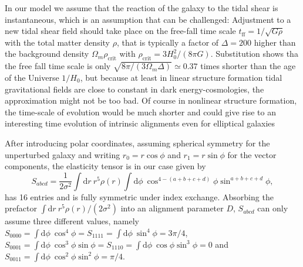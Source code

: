 \documentclass[a4paper,fleqn,usenatbib]{mnras}
\newcommand{\dd}{\mathrm{d}}
\begin{document}
In our model we assume that the reaction of the galaxy to the tidal shear is instantaneous, which is an assumption that can be challenged: Adjustment to a new tidal shear field should take place on the free-fall time scale $t_\mathrm{ff} = 1/\sqrt{G\rho}$ with the total matter density $\rho$, that is typically a factor of $\Delta = 200$ higher than the background density $\Omega_m\rho_\mathrm{crit}$ with $\rho_\mathrm{crit} = 3H_0^2/(8\pi G)$. Substitution shows tha the free fall time scale is only $\sqrt{8\pi/(3\Omega_m\Delta)}\simeq 0.37$ times shorter than the age of the Universe $1/H_0$, but because at least in linear structure formation tidal gravitational fields are close to constant in dark energy-cosmologies, the approximation might not be too bad. Of course in nonlinear structure formation, the time-scale of evolution would be much shorter and could give rise to an interesting time evolution of intrinsic alignments even for elliptical galaxies \citep{lee_nonlinear_2007, schafer_galactic_2012, schmitz_time_2018} 

After introducing polar coordinates, assuming spherical symmetry for the unperturbed galaxy and writing $r_0=r\cos\phi$ and $r_1=r\sin\phi$ for the vector components, the elasticity tensor is in our case given by
\begin{equation}
S_{abcd} = 
\frac{1}{2\sigma^2}\int\dd r\:r^5\rho(r)\int\dd\phi\:\cos^{4-(a+b+c+d)}\phi\sin^{a+b+c+d}\phi,
\end{equation}
has 16 entries and is fully symmetric under index exchange. Absorbing the prefactor $\int\dd r\:r^5\rho(r)/(2\sigma^2)$ into an alignment parameter $D$, $S_{abcd}$ can only assume three different values, namely $S_{0000} = \int\dd\phi\:\cos^4\phi = S_{1111} = \int\dd\phi\:\sin^4\phi = 3\pi/4$, $S_{0001} = \int\dd\phi\:\cos^3\phi\sin\phi = S_{1110} = \int\dd\phi\:\cos\phi\sin^3\phi = 0$ and $S_{0011} = \int\dd\phi\:\cos^2\phi\sin^2\phi = \pi/4$. 
\end{document}
